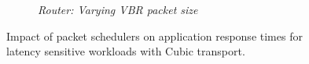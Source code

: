 \begin{figure}[th!]
\begin{subfigure}[t]{.30\linewidth}
    \caption{\small{\textit{Router: Varying VBR packet size}}}
    \label{fig:vbr-1456-cpu-latency-full}
  \end{subfigure}
  \vspace{-3mm}
  \caption{\small{Impact of packet  schedulers on application response times for latency sensitive workloads with Cubic transport.}}
  \vspace{-0.4cm}
  \label{fig:request-full}
\end{figure}


